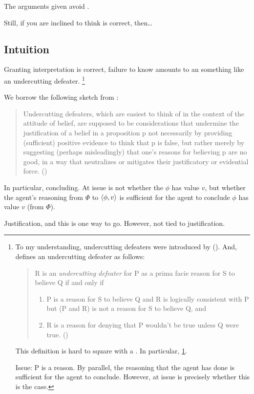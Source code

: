 \begin{note}
  The arguments given avoid \agpe{}.

  Still, if you are inclined to think \agpe{} is correct, then\dots
\end{note}

\subsection{Intuition}
\label{sec:intuition-1}

\begin{note}
  Granting interpretation is correct, failure to know \fc{} amounts to an something like an undercutting defeater.%
  \footnote{
    To my understanding, undercutting defeaters were introduced by \citeauthor{Pollock:1987un} (\citeyear{Pollock:1987un}).
    And, \citeauthor{Pollock:1987un} defines an undercutting defeater as follows:
    \begin{quote}
    R is an \emph{undercutting defeater} for P as a prima facie reason for S to believe Q if and only if
    \begin{enumerate}[label=(UD\arabic*), ref=(UD\arabic*)]
    \item
      \label{pollock:ud:1}
      P is a reason for S to believe Q and R is logically consistent with P but (P and R) is not a reason for S to believe Q, and
    \item
      \label{pollock:ud:2}
      R is a reason for denying that P wouldn't be true unless Q were true.%
      \mbox{}\hfill\mbox{(\citeyear[485]{Pollock:1987un})}
    \end{enumerate}
  \end{quote}
  This definition is hard to square with a \requ{}.
  In particular, \ref{pollock:ud:1}.

  Issue: P is a reason.
  By parallel, the reasoning that the agent has done is sufficient for the agent to conclude.
  However, at issue is precisely whether this is the case.
  }

  We borrow the following sketch from \textcite{Worsnip:2018aa}:
  \begin{quote}
    Undercutting defeaters, which are easiest to think of in the context of the attitude of belief, are supposed to be considerations that undermine the justification of a belief in a proposition p not necessarily by providing (sufficient) positive evidence to think that p is false, but rather merely by suggesting (perhaps misleadingly) that one's reasons for believing p are no good, in a way that neutralizes or mitigates their justificatory or evidential force.%
    \mbox{}\hfill\mbox{(\citeyear[29]{Worsnip:2018aa})}
  \end{quote}

  In particular, concluding.
  At issue is not whether the \(\phi\) has value \(v\), but whether the agent's reasoning from \(\Phi\) to \(\langle \phi, v \rangle\) is sufficient for the agent to conclude \(\phi\) has value \(v\) (from \(\Phi\)).

  Justification, and this is one way to go.
  However, not tied to justification.
\end{note}


